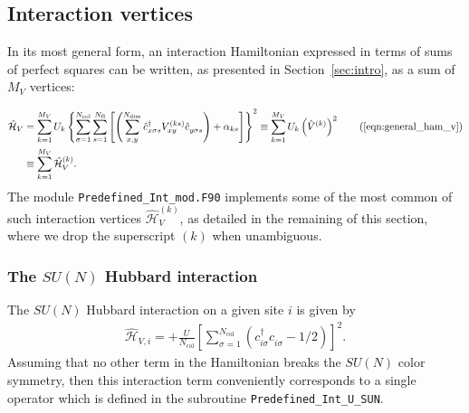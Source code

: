 %
\subsection{Interaction vertices} \label{sec:interaction_vertices}

In its most general form, an interaction Hamiltonian expressed in terms of sums of perfect squares can be written, as presented in Section~\ref{sec:intro}, as a sum of $M_V$ vertices: %

\begin{align*}
\hat{\mathcal{H}}_{V} &=  \sum\limits_{k=1}^{M_V}U_{k}
\left\{ \sum\limits_{\sigma=1}^{N_{\mathrm{col}}}
\sum\limits_{s=1}^{N_{\mathrm{fl}}} \left[ \left(
\sum\limits_{x,y}^{N_{\mathrm{dim}}} \hat{c}^{\dagger}_{x \sigma s}V_{xy}^{(k s)}\hat{c}^{\phantom\dagger}_{y \sigma s}\right)  +\alpha_{k s}  \right] \right\}^{2}
\equiv    \sum\limits_{k=1}^{M_V}U_{k}   \left(\hat{V}^{(k)} \right)^2 \tag{\ref{eqn:general_ham_v}}\\
&\equiv    \sum\limits_{k=1}^{M_V}\hat{\mathcal{H}}_V^{(k)}.
\end{align*}
The module \texttt{Predefined\_Int\_mod.F90} implements some of the most common of such interaction vertices $\hat{\mathcal{H}}_V^{(k)}$, as detailed in the remaining of this section, where we drop the superscript $(k)$ when unambiguous.

\subsubsection{The $SU(N)$ Hubbard interaction}

The $SU(N)$ Hubbard interaction on a given site $i$ is given by 
\begin{align}
\hat{\mathcal{H}}_{V,i} =
+ \frac{U}{N_{\mathrm{col}}}\left[
\sum\limits_{\sigma=1}^{N_{\mathrm{col}}}
\left(  c^{\dagger}_{i \sigma} c^{\phantom\dagger}_{i\sigma}  -1/2 \right) \right]^{2}.
\end{align} 
Assuming that no other term in the Hamiltonian breaks the $SU(N) $  color symmetry,  then this interaction term  conveniently corresponds to  a single 
operator  which is defined in the subroutine \texttt{Predefined\_Int\_U\_SUN}.   

